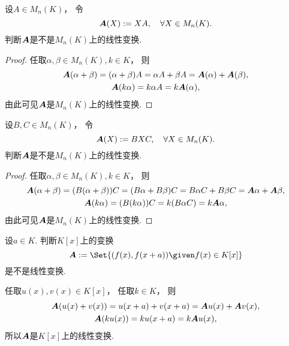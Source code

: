 \begin{example}\label{example:线性映射.右乘矩阵是线性映射}
设\(A \in M_n(K)\)，
令\begin{equation*}
	\boldsymbol{A}(X) := X A,
	\quad \forall X \in M_n(K).
\end{equation*}
判断\(\boldsymbol{A}\)是不是\(M_n(K)\)上的线性变换.
\begin{proof}
任取\(\alpha,\beta \in M_n(K),
k \in K\)，
则\begin{gather*}
	\boldsymbol{A}(\alpha + \beta)
	= (\alpha + \beta) A
	= \alpha A + \beta A
	= \boldsymbol{A}(\alpha) + \boldsymbol{A}(\beta), \\
	\boldsymbol{A}(k \alpha)
	= k \alpha A
	= k \boldsymbol{A}(\alpha),
\end{gather*}
由此可见\(\boldsymbol{A}\)是\(M_n(K)\)上的线性变换.
\end{proof}
\end{example}

\begin{example}
设\(B,C \in M_n(K)\)，
令\begin{equation*}
	\boldsymbol{A}(X) := B X C,
	\quad \forall X \in M_n(K).
\end{equation*}
判断\(\boldsymbol{A}\)是不是\(M_n(K)\)上的线性变换.
\begin{proof}
任取\(\alpha,\beta \in M_n(K),
k \in K\)，
则\begin{gather*}
	\boldsymbol{A}(\alpha+\beta)
	= (B(\alpha+\beta))C
	= (B\alpha+B\beta)C
	= B \alpha C + B \beta C
	= \boldsymbol{A}\alpha + \boldsymbol{A}\beta, \\
	\boldsymbol{A}(k \alpha)
	= (B(k\alpha))C
	= k (B \alpha C)
	= k \boldsymbol{A}\alpha,
\end{gather*}
由此可见\(\boldsymbol{A}\)是\(M_n(K)\)上的线性变换.
\end{proof}
\end{example}

\begin{example}
设\(a \in K\).
判断\(K[x]\)上的变换\begin{equation*}
	\vb{A} \defeq \Set{
		(f(x),f(x+a))
		\given
		f(x) \in K[x]
	}
\end{equation*}是不是线性变换.
\begin{solution}
任取\(u(x),v(x) \in K[x]\)，
任取\(k \in K\)，
则\begin{gather*}
	\boldsymbol{A}(u(x)+v(x))
	= u(x+a) + v(x+a)
	= \boldsymbol{A}u(x) + \boldsymbol{A}v(x), \\
	\boldsymbol{A}(k u(x))
	= k u(x+a)
	= k \boldsymbol{A}u(x),
\end{gather*}
所以\(\boldsymbol{A}\)是\(K[x]\)上的线性变换.
\end{solution}
\end{example}


